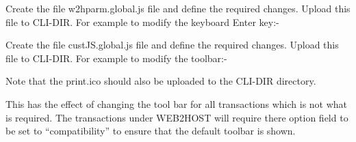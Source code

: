 \documentclass[letterpaper,10pt,english]{sphinxmanual}
\begin{document}
Create the file w2hparm.global.js file and define the required changes. Upload this file to CLI-DIR. For example to modify the keyboard Enter key:-

\begin{sphinxVerbatim}[commandchars=\\\{\}]
  
               
\end{sphinxVerbatim}

Create the file custJS.global.js file and define the required changes. Upload this file to CLI-DIR. For example to modify the toolbar:-

\begin{sphinxVerbatim}[commandchars=\\\{\}]
  
    
  
\end{sphinxVerbatim}

Note that the print.ico should also be uploaded to the CLI-DIR directory.

This has the effect of changing the tool bar for all transactions which is not what is required. The transactions under WEB2HOST will require there option field to be set to “compatibility” to ensure that the default toolbar is shown.
\end{document}
